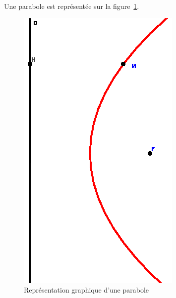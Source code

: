Une parabole est représentée sur la figure~\ref{fig:parabole}.

\begin{figure}[!h]
  \centering
  \includegraphics[width=\textwidth, scale=1]{parabole.eps}
  \caption{Représentation graphique d'une parabole}
  \label{fig:parabole}
\end{figure}


